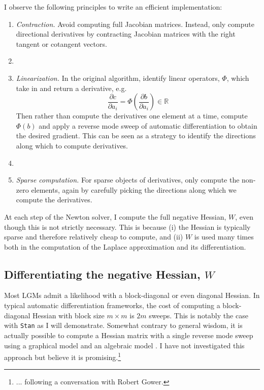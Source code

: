 \documentclass[stslayout, noinfoline]{imsart}
\theoremstyle{definition}
\begin{document}
I observe the following principles to write an efficient implementation:
\begin{enumerate}
  \item \textit{Contraction.} Avoid computing full Jacobian matrices. Instead, only compute directional derivatives by contracting Jacobian matrices with the right tangent or cotangent vectors.
  \item[]
  \item \textit{Linearization.} In the original algorithm, identify linear operators, $\Phi$, which take in and return a derivative, e.g.
  \begin{equation*}
    \frac{\partial c}{\partial a_i} = \Phi \left (\frac{\partial b}{\partial a_i} \right) \in \mathbb R
  \end{equation*}
  Then rather than compute the derivatives one element at a time,
  compute $\Phi(b)$ and apply a reverse mode sweep of automatic differentiation
  to obtain the desired gradient.
  This can be seen as a strategy to identify the directions along which to compute derivatives.
  \item[]
  \item \textit{Sparse computation.} For sparse objects of derivatives, only compute the non-zero elements,
  again by carefully picking the directions along which we compute the derivatives.
\end{enumerate}
%
At each step of the Newton solver, I compute the full negative Hessian, $W$, even though this is not strictly necessary.
This is because (i) the Hessian is typically sparse and therefore relatively cheap to compute,
and (ii) $W$ is used many times both in the computation of the Laplace approximation and its differentiation.

\subsection{Differentiating the negative Hessian, $W$}

Most LGMs admit a likelihood with a block-diagonal or even diagonal Hessian.
In typical automatic differentiation frameworks, the cost of computing a block-diagonal Hessian with block size $m \times m$ is $2m$ sweeps.
This is notably the case with \texttt{Stan} as I will demonstrate.
Somewhat contrary to general wisdom, it is actually possible to compute a Hessian matrix with a single reverse mode sweep using a graphical model and an algebraic model \citep{Gower:2011}.
I have not investigated this approach but believe it is promising.\footnote{... following a conversation with Robert Gower.}
\end{document}
